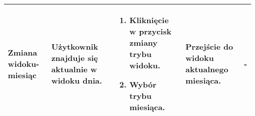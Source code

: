 \documentclass{article}
\begin{document}
\begin{flushleft}
\begin{longtable}[H]{| m{3.5cm} | m{3.5cm} | m{3.5cm} | m{3.5cm} | m{3.5cm} |}
	Zmiana widoku- miesiąc & Użytkownik znajduje się aktualnie w widoku dnia. & \begin{enumerate}[leftmargin =*, topsep=0pt] \item Kliknięcie w przycisk zmiany trybu widoku. \item Wybór trybu 
	miesiąca. \end{enumerate} & Przejście do widoku aktualnego miesiąca. & - \\ \hline
	\end{longtable}


\end{flushleft}
\end{document}
